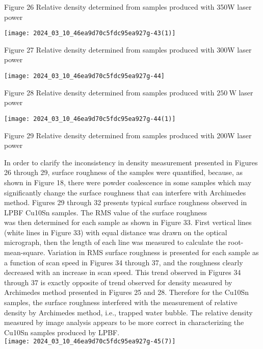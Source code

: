 \documentclass[10pt]{article}
\begin{document}
Figure 26 Relative density determined from samples produced with 350W laser power

\begin{center}
\texttt{[image: 2024\_03\_10\_46ea9d70c5fdc95ea927g-43(1)]}
\end{center}

Figure 27 Relative density determined from samples produced with 300W laser power

\begin{center}
\texttt{[image: 2024\_03\_10\_46ea9d70c5fdc95ea927g-44]}
\end{center}

Figure 28 Relative density determined from samples produced with $250 \mathrm{~W}$ laser power

\begin{center}
\texttt{[image: 2024\_03\_10\_46ea9d70c5fdc95ea927g-44(1)]}
\end{center}

Figure 29 Relative density determined from samples produced with 200W laser power

In order to clarify the inconsistency in density measurement presented in Figures 26 through 29, surface roughness of the samples were quantified, because, as shown in Figure 18, there were powder coalescence in some samples which may significantly change the surface roughness that can interfere with Archimedes method. Figures 29 through 32 presents typical surface roughness observed in LPBF Cu10Sn samples. The RMS value of the surface roughness\\
was then determined for each sample as shown in Figure 33. First vertical lines (white lines in Figure 33) with equal distance was drawn on the optical micrograph, then the length of each line was measured to calculate the root-mean-square. Variation in RMS surface roughness is presented for each sample as a function of scan speed in Figures 34 through 37, and the roughness clearly decreased with an increase in scan speed. This trend observed in Figures 34 through 37 is exactly opposite of trend observed for density measured by Archimedes method presented in Figures 25 and 28. Therefore for the Cu10Sn samples, the surface roughness interfered with the measurement of relative density by Archimedes method, i.e., trapped water bubble. The relative density measured by image analysis appears to be more correct in characterizing the Cu10Sn samples produced by LPBF.\\
\texttt{[image: 2024\_03\_10\_46ea9d70c5fdc95ea927g-45(7)]}
\end{document}
